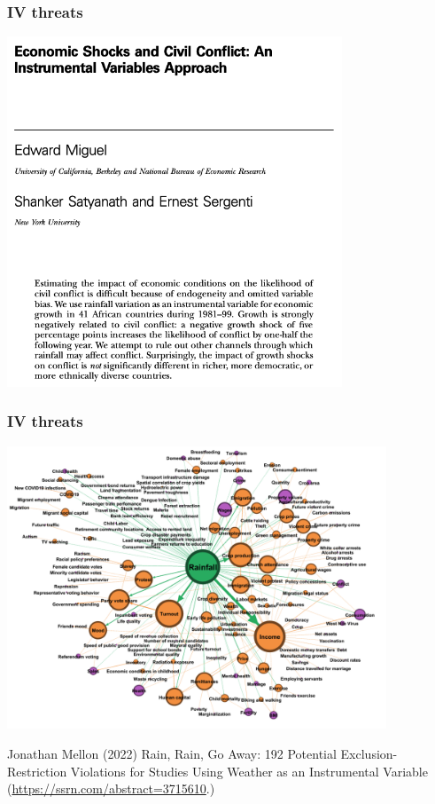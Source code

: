 \documentclass[aspectratio=43]{beamer}
\begin{document}
\begin{frame}
\frametitle{IV threats}
\centering

\includegraphics[width = 0.75\textwidth]{../img/rainfall_conflict}


\end{frame}

\begin{frame}
\frametitle{IV threats}
\centering

\includegraphics[width = 0.85\textwidth]{../img/rainfall_papers}

{\scriptsize Jonathan Mellon (2022) Rain, Rain, Go Away: 192 Potential Exclusion-Restriction Violations for Studies Using Weather as an Instrumental Variable (\href{https://ssrn.com/abstract=3715610}{https://ssrn.com/abstract=3715610}.)}


\end{frame}
\end{document}
